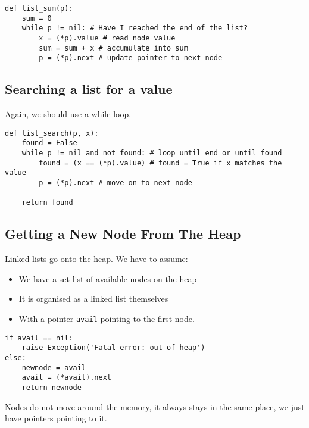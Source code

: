 \begin{verbatim}
def list_sum(p):
    sum = 0
    while p != nil: # Have I reached the end of the list?
        x = (*p).value # read node value
        sum = sum + x # accumulate into sum
        p = (*p).next # update pointer to next node
\end{verbatim}

\subsection{Searching a list for a value}\label{sub:searching_a_list_for_a_value}

Again, we should use a while loop.

\begin{verbatim}
def list_search(p, x):
    found = False
    while p != nil and not found: # loop until end or until found
        found = (x == (*p).value) # found = True if x matches the value
        p = (*p).next # move on to next node

    return found
\end{verbatim}

\subsection{Getting a New Node From The Heap}\label{sub:getting_a_new_node_from_the_heap}

Linked lists go onto the heap.
We have to assume:
\begin{itemize}
	\item We have a set list of available nodes on the heap
	\item It is organised as a linked list themselves
	\item With a pointer \texttt{avail} pointing to the first node.
\end{itemize}

\begin{verbatim}
if avail == nil:
    raise Exception('Fatal error: out of heap')
else:
    newnode = avail
    avail = (*avail).next
    return newnode
\end{verbatim}

\begin{note}
	Nodes do not move around the memory, it always stays in the same place, we just have pointers pointing to it.
\end{note}

